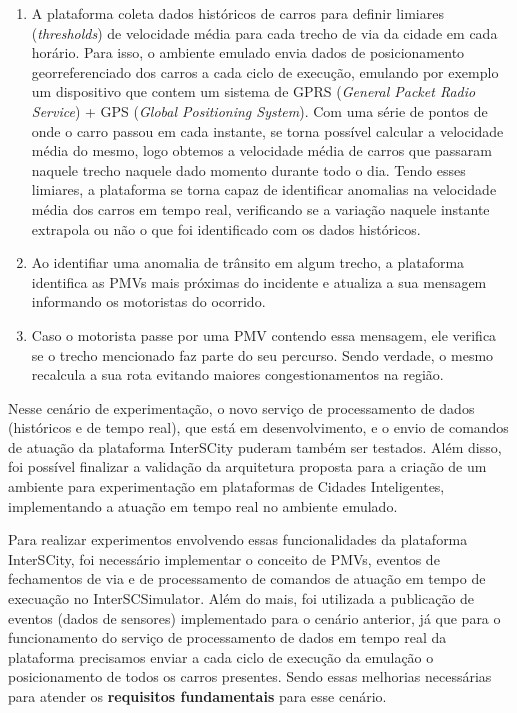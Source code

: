 \begin{enumerate}
    \item A plataforma coleta dados históricos de carros para definir limiares (\textit{thresholds}) de velocidade média para cada trecho de via da cidade em cada horário.
        Para isso, o ambiente emulado envia dados de posicionamento georreferenciado dos carros a cada ciclo de execução, emulando por exemplo um dispositivo que contem um
        sistema de GPRS (\textit{General Packet Radio Service}) + GPS (\textit{Global Positioning System}).
        Com uma série de pontos de onde o carro passou em cada instante, se torna possível calcular a velocidade média do mesmo, logo obtemos a velocidade média de carros
        que passaram naquele trecho naquele dado momento durante todo o dia.
        Tendo esses limiares, a plataforma se torna capaz de identificar anomalias na velocidade média dos carros em tempo real, verificando se a variação naquele instante
        extrapola ou não o que foi identificado com os dados históricos.

    \item Ao identifiar uma anomalia de trânsito em algum trecho, a plataforma identifica as PMVs mais próximas do incidente e atualiza a sua mensagem informando os motoristas
        do ocorrido.

    \item Caso o motorista passe por uma PMV contendo essa mensagem, ele verifica se o trecho mencionado faz parte do seu percurso. Sendo verdade, o mesmo recalcula a sua
        rota evitando maiores congestionamentos na região.
\end{enumerate}

Nesse cenário de experimentação, o novo serviço de processamento de dados (históricos e de tempo real), que está em desenvolvimento, e o envio de comandos de atuação da plataforma
InterSCity puderam também ser testados.
Além disso, foi possível finalizar a validação da arquitetura proposta para a criação de um ambiente para experimentação em plataformas de Cidades Inteligentes,
implementando a atuação em tempo real no ambiente emulado.

Para realizar experimentos envolvendo essas funcionalidades da plataforma InterSCity, foi necessário implementar o conceito de PMVs, eventos de fechamentos de via e de
processamento de comandos de atuação em tempo de execuação no InterSCSimulator.
Além do mais, foi utilizada a publicação de eventos (dados de sensores) implementado para o cenário anterior, já que para o funcionamento do serviço de processamento de dados
em tempo real da plataforma precisamos enviar a cada ciclo de execução da emulação o posicionamento de todos os carros presentes.
Sendo essas melhorias necessárias para atender os \textbf{requisitos fundamentais} para esse cenário.

